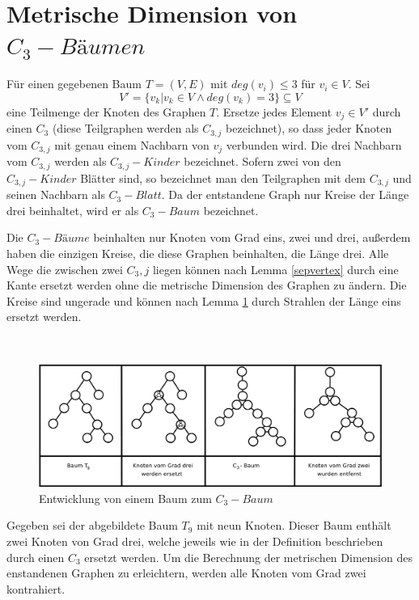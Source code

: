 \section{Metrische Dimension von $C_3-Bäumen$}
\begin{defi}
\label{C_{3} tree}
Für einen gegebenen Baum $T=(V,E)$ mit $deg(v_i)\leq 3$ für $v_i \in V$. Sei $$V'=\{v_k|v_k \in V \wedge deg(v_k)=3\}\subseteq V$$ eine Teilmenge der Knoten des Graphen $T$. Ersetze jedes Element $v_j \in V'$ durch einen $C_3$ (diese Teilgraphen werden als \emph{$C_{3,j}$} bezeichnet), so dass jeder Knoten vom $C_{3,j}$ mit genau einem Nachbarn von $v_j$ verbunden wird. Die drei Nachbarn vom $C_{3,j}$ werden als \emph{$C_{3,j}-Kinder$} bezeichnet. Sofern zwei von den $C_{3,j}-Kinder$ Blätter sind, so bezeichnet man den Teilgraphen mit dem $C_{3,j}$ und seinen Nachbarn als \emph{$C_{3}-Blatt$}. Da der entstandene Graph nur Kreise der Länge drei beinhaltet, wird er als \emph{$C_3-Baum$} bezeichnet. 
   \end{defi}
   \begin{bem}
Die $C_3-Bäume$ beinhalten nur Knoten vom Grad eins, zwei und drei, außerdem haben die einzigen Kreise, die diese Graphen beinhalten, die Länge drei. Alle Wege die zwischen zwei $C_3,j$ liegen können nach Lemma \ref{sepvertex} durch eine Kante ersetzt werden ohne die metrische Dimension des Graphen zu ändern. Die Kreise  sind ungerade und können nach Lemma \ref{} durch Strahlen der Länge eins ersetzt werden.
\end{bem} 
\begin{bsp}~
\begin{figure}[h!]
		\centering 		 
   \includegraphics[width=350pt]{bilder/trees.pdf}
	\caption{Entwicklung von einem Baum zum $C_{3}-Baum$}
  	 \end{figure}
\end{bsp}
Gegeben sei der abgebildete Baum $T_9$ mit neun Knoten. Dieser Baum enthält zwei Knoten von Grad drei, welche jeweils wie in der Definition beschrieben durch einen $C_3$ ersetzt werden. Um die Berechnung der metrischen Dimension des enstandenen Graphen zu erleichtern, werden alle Knoten vom Grad zwei kontrahiert.
